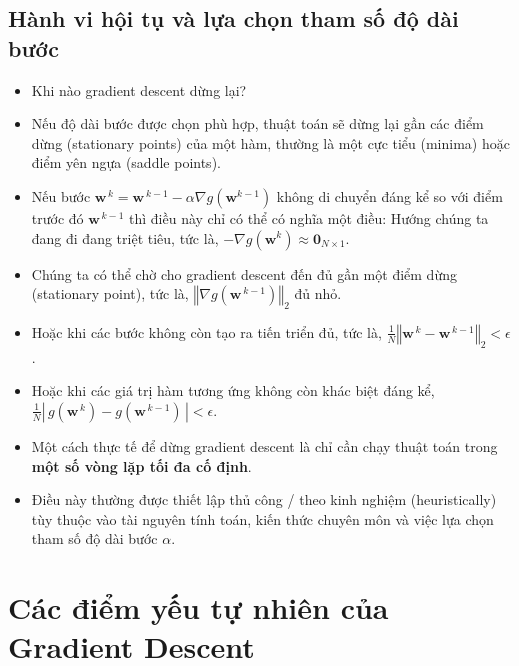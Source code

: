 \documentclass{book}
\begin{document}
\subsection{Hành vi hội tụ và lựa chọn tham số độ dài bước}
\begin{itemize}
    \item Khi nào gradient descent dừng lại?
    \item Nếu độ dài bước được chọn phù hợp, thuật toán sẽ dừng lại gần các điểm dừng (stationary points) của một hàm, thường là một cực tiểu (minima) hoặc điểm yên ngựa (saddle points).
    \item Nếu bước $\mathbf{w}^{\,k} = \mathbf{w}^{\,k-1} - \alpha \nabla g\left(\mathbf{w}^{k-1}\right)$ không di chuyển đáng kể so với điểm trước đó $\mathbf{w}^{\,k-1}$ thì điều này chỉ có thể có nghĩa một điều: Hướng chúng ta đang đi đang triệt tiêu, tức là, $-\nabla g\left(\mathbf{w}^k\right) \approx \mathbf{0}_{N\times 1}$.
    \item Chúng ta có thể chờ cho gradient descent đến đủ gần một điểm dừng (stationary point), tức là, $\left\Vert \nabla g\left(\mathbf{w}^{\,k-1}\right)\right\Vert_2$ đủ nhỏ. 
    \item Hoặc khi các bước không còn tạo ra tiến triển đủ, tức là, $\frac{1}{N}\left\Vert \mathbf{w}^{\,k}-\mathbf{w}^{\,k-1}\right\Vert_2 < \epsilon$.
    \item Hoặc khi các giá trị hàm tương ứng không còn khác biệt đáng kể, $\frac{1}{N}\left\vert\, g(\mathbf{w}^{\,k})-g(\mathbf{w}^{\,k-1})\,\right\vert < \epsilon$.
    \item Một cách thực tế để dừng gradient descent là chỉ cần chạy thuật toán trong \textbf{một số vòng lặp tối đa cố định}.
    \item Điều này thường được thiết lập thủ công / theo kinh nghiệm (heuristically) tùy thuộc vào tài nguyên tính toán, kiến thức chuyên môn và việc lựa chọn tham số độ dài bước $\alpha$.
\end{itemize}

\section{Các điểm yếu tự nhiên của Gradient Descent}
\end{document}
